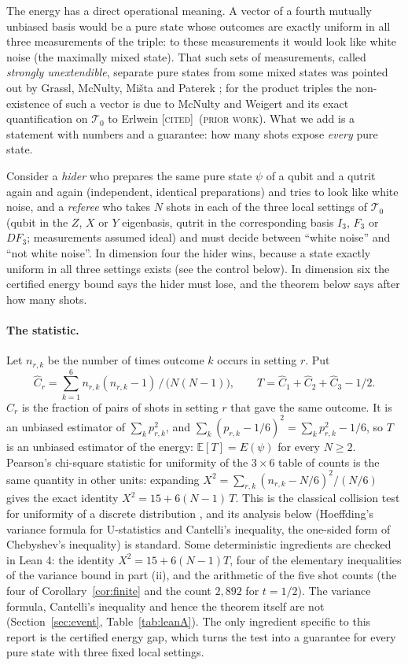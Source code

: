 \documentclass[11pt]{article}
\newcommand{\Tz}{\mathcal{T}_0}          %
\newcommand{\E}{E}                       %
\newcommand{\st}[1]{\textsc{[#1]}}
\newcommand{\stcited}{\st{cited}}
\newcommand{\prior}{\textsc{(prior work)}}
\theoremstyle{definition}
\theoremstyle{remark}
\begin{document}
The energy has a direct operational meaning. A vector of a fourth mutually unbiased basis would be a pure state
whose outcomes are exactly uniform in all three measurements of the triple: to these measurements it would look
like white noise (the maximally mixed state). That such sets of measurements, called \emph{strongly unextendible},
separate pure states from some mixed states was pointed out by Grassl, McNulty, Mi\v{s}ta and Paterek
\cite{GMMP17}; for the product triples the non-existence of such a vector is due to McNulty and Weigert
\cite{MW12} and its exact quantification on $\Tz$ to Erlwein \cite{Erlwein} \stcited\ \prior. What we add is a
statement with numbers and a guarantee: how many shots expose \emph{every} pure state.

Consider a \emph{hider} who prepares the same pure state $\psi$ of a qubit and a qutrit again and again
(independent, identical preparations) and tries to look like white noise, and a \emph{referee} who takes $N$ shots
in each of the three local settings of $\Tz$ (qubit in the $Z$, $X$ or $Y$ eigenbasis, qutrit in the corresponding
basis $I_3$, $F_3$ or $DF_3$; measurements assumed ideal) and must decide between ``white noise'' and ``not white
noise''. In dimension four the hider wins, because a state exactly uniform in all three settings exists (see the control
below). In dimension six the certified energy bound says
the hider must lose, and the theorem below says after how many shots.

\paragraph{The statistic.} Let $n_{r,k}$ be the number of times outcome $k$ occurs in setting $r$. Put
\[
  \widehat C_r=\sum_{k=1}^{6}n_{r,k}(n_{r,k}-1)\,\big/\,\bigl(N(N-1)\bigr),\qquad
  T=\widehat C_1+\widehat C_2+\widehat C_3-1/2 .
\]
$\widehat C_r$ is the fraction of pairs of shots in setting $r$ that gave the same outcome. It is an unbiased
estimator of $\sum_kp_{r,k}^2$, and $\sum_k(p_{r,k}-1/6)^2=\sum_kp_{r,k}^2-1/6$, so $T$ is an unbiased
estimator of the energy: $\mathbb E[T]=\E(\psi)$ for every $N\ge2$. Pearson's chi-square statistic for uniformity of the
$3\times6$ table of counts is the same quantity in other units: expanding
$X^2=\sum_{r,k}(n_{r,k}-N/6)^2/(N/6)$ gives the exact identity $X^2=15+6(N-1)\,T$.
This is the classical collision test for uniformity of a discrete distribution \cite{GR00,Paninski08}, and its
analysis below (Hoeffding's variance formula for U-statistics \cite{Hoeffding48} and Cantelli's inequality, the
one-sided form of Chebyshev's inequality) is standard. Some deterministic ingredients are checked in Lean 4: the identity
$X^2=15+6(N-1)T$, four of the elementary inequalities of the variance bound in part (ii), and the arithmetic of the
five shot counts (the four of Corollary~\ref{cor:finite} and the count $2{,}892$ for $t=1/2$). The variance formula, Cantelli's inequality and hence the theorem
itself are not (Section~\ref{sec:event}, Table~\ref{tab:leanA}). The only ingredient specific to this report is the certified energy gap, which turns the test into a
guarantee for every pure state with three fixed local settings.
\end{document}
